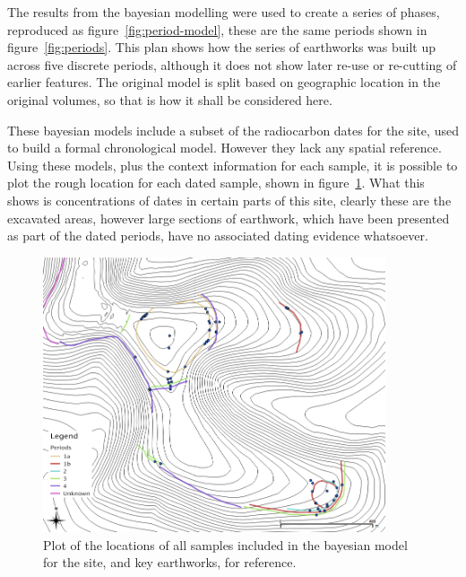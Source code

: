 The results from the bayesian modelling were used to create a series of phases, reproduced as  figure~\ref{fig:period-model}, these are the same periods shown in figure~\ref{fig:periods}. This plan shows how the series of earthworks was built up across five discrete periods, although it does not show later re-use or re-cutting of earlier features. The original model is split based on geographic location in the original volumes, so that is how it shall be considered here.  

These bayesian models include a subset of the radiocarbon dates for the site, used to build a formal chronological model. However they lack any spatial reference. Using these models, plus the context information for each sample, it is possible to plot the rough location for each dated sample, shown in figure~\ref{fig:dates}. What this shows is concentrations of dates in certain parts of this site, clearly these are the excavated areas, however large sections of earthwork, which have been presented as part of the dated periods, have no associated dating evidence whatsoever. 

\begin{figure}
\centering
	\includegraphics[width=0.9\textwidth]{figures/dates}
  \caption{Plot of the locations of all samples included in the bayesian model for the site, and key earthworks, for reference.}
  \label{fig:dates}
\end{figure}

